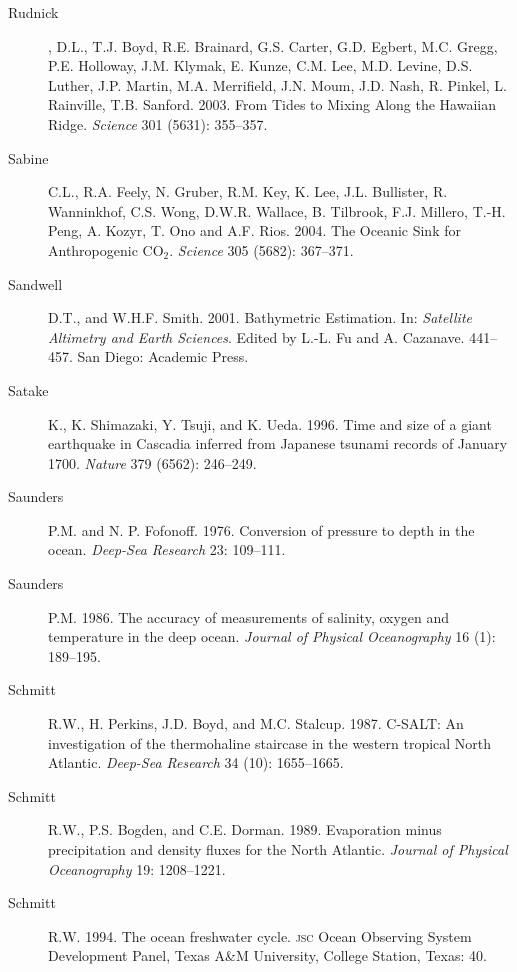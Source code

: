 \begin{description}
\item [Rudnick], D.L., T.J. Boyd, R.E. Brainard, G.S. Carter,
  G.D. Egbert, M.C. Gregg, P.E. Holloway, J.M. Klymak, E. Kunze,
  C.M. Lee, M.D. Levine, D.S. Luther, J.P. Martin, M.A. Merrifield,
  J.N. Moum, J.D. Nash, R. Pinkel, L. Rainville,
  T.B. Sanford. 2003. From Tides to Mixing Along the Hawaiian
  Ridge. \textit{Science} 301 (5631): 355--357.

\item [Sabine]C.L., R.A. Feely, N. Gruber, R.M. Key, K. Lee,
  J.L. Bullister, R. Wanninkhof, C.S. Wong, D.W.R. Wallace,
  B. Tilbrook, F.J. Millero, T.-H. Peng, A. Kozyr, T. Ono and
  A.F. Rios. 2004. The Oceanic Sink for Anthropogenic
  CO$_2$. \textit{Science} 305 (5682): 367--371.

\item [Sandwell]D.T., and W.H.F. Smith. 2001. Bathymetric
  Estimation. In: \textit{Satellite Altimetry and Earth
    Sciences}. Edited by L.-L. Fu and A. Cazanave. 441--457. San
  Diego: Academic Press.

\item [Satake]K., K. Shimazaki, Y. Tsuji, and K. Ueda. 1996. Time and
  size of a giant earthquake in Cascadia inferred from Japanese
  tsunami records of January 1700. \textit{Nature} 379 (6562):
  246--249.

\item [Saunders]P.M. and N. P. Fofonoff. 1976. Conversion of pressure
  to depth in the ocean. \textit{Deep-Sea Research} 23: 109--111.

\item [Saunders]P.M. 1986. The accuracy of measurements of salinity,
  oxygen and temperature in the deep ocean. \textit{Journal of
    Physical Oceanography} 16 (1): 189--195.

\item [Schmitt]R.W., H. Perkins, J.D. Boyd, and
  M.C. Stalcup. 1987. C-SALT: An investigation of the thermohaline
  staircase in the western tropical North Atlantic. \textit{Deep-Sea
    Research} 34 (10): 1655--1665.

\item [Schmitt]R.W., P.S. Bogden, and C.E. Dorman. 1989. Evaporation
  minus precipitation and density fluxes for the North
  Atlantic. \textit{Journal of Physical Oceanography} 19: 1208--1221.

\item [Schmitt]R.W. 1994. The ocean freshwater cycle. \textsc{jsc}
  Ocean Observing System Development Panel, Texas A\&M University,
  College Station, Texas: 40.


\end{description}
